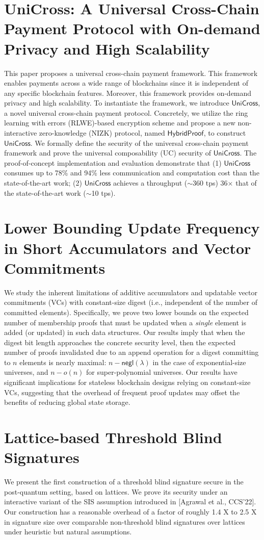 \documentclass[11pt,oneside]{book}
\theoremstyle{definition}
\theoremstyle{remark}
\theoremstyle{plain}
\begin{document}
\section{\cite{cryptoeprint:2025/1554} UniCross: A Universal Cross-Chain Payment Protocol with On-demand Privacy and High Scalability}
This paper proposes a universal cross-chain payment framework. This framework enables payments across a wide range of blockchains since it is independent of any specific blockchain features. Moreover, this framework provides on-demand privacy and high scalability. To instantiate the framework, we introduce $\mathsf{UniCross}$, a novel universal cross-chain payment protocol. Concretely, we utilize the ring learning with errors (RLWE)-based encryption scheme and propose a new non-interactive zero-knowledge (NIZK) protocol, named $\mathsf{HybridProof}$, to construct $\mathsf{UniCross}$. We formally define the security of the universal cross-chain payment framework and prove the universal composability (UC) security of $\mathsf{UniCross}$. The proof-of-concept implementation and evaluation demonstrate that (1) $\mathsf{UniCross}$ consumes up to 78\% and 94\% less communication and computation cost than the state-of-the-art work; (2) $\mathsf{UniCross}$ achieves a throughput ($\sim$360 tps) 36$\times$ that of the state-of-the-art work ($\sim$10 tps).
\section{\cite{cryptoeprint:2025/1558} Lower Bounding Update Frequency in Short Accumulators and Vector Commitments}
We study the inherent limitations of additive accumulators and updatable vector commitments (VCs) with constant-size digest (i.e., independent of the number of committed elements). Specifically, we prove two lower bounds on the expected number of membership proofs that must be updated when a \emph{single} element is added (or updated) in such data structures. Our results imply that when the digest bit length approaches the concrete security level, then the expected number of proofs invalidated due to an append operation for a digest committing to $n$ elements is nearly maximal: $n-\mathsf{negl}(\lambda)$ in the case of exponential-size universes, and $n-o(n)$ for super-polynomial universes. Our results have significant implications for stateless blockchain designs relying on constant-size VCs, suggesting that the overhead of frequent proof updates may offset the benefits of reducing global state storage.
\section{\cite{cryptoeprint:2025/1566} Lattice-based Threshold Blind Signatures}
We present the first construction of a threshold blind signature secure in the post-quantum setting, based on lattices. We prove its security under an interactive variant of the SIS assumption introduced in [Agrawal et al., CCS’22]. Our construction has a reasonable overhead of a factor of roughly 1.4 X to 2.5 X in signature size over comparable non-threshold blind signatures over lattices under heuristic but natural assumptions.
\end{document}
